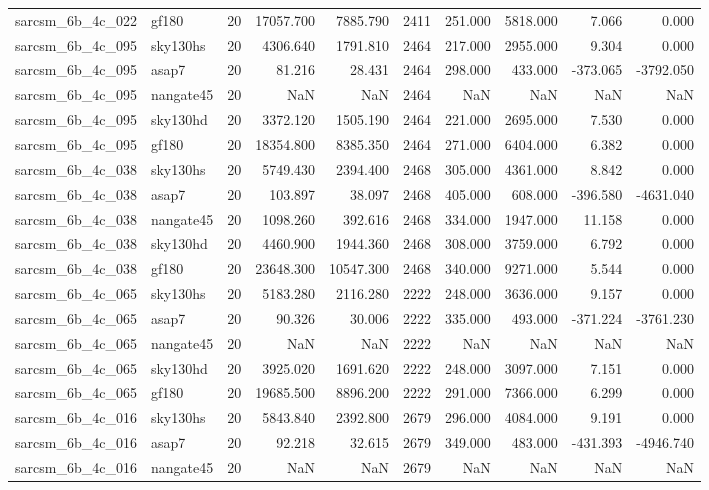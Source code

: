 \begin{longtable}{llrrrrrrrr}
sarcsm\_6b\_4c\_022 & gf180 & 20 & 17057.700 & 7885.790 & 2411 & 251.000 & 5818.000 & 7.066 & 0.000 \\
sarcsm\_6b\_4c\_095 & sky130hs & 20 & 4306.640 & 1791.810 & 2464 & 217.000 & 2955.000 & 9.304 & 0.000 \\
sarcsm\_6b\_4c\_095 & asap7 & 20 & 81.216 & 28.431 & 2464 & 298.000 & 433.000 & -373.065 & -3792.050 \\
sarcsm\_6b\_4c\_095 & nangate45 & 20 & NaN & NaN & 2464 & NaN & NaN & NaN & NaN \\
sarcsm\_6b\_4c\_095 & sky130hd & 20 & 3372.120 & 1505.190 & 2464 & 221.000 & 2695.000 & 7.530 & 0.000 \\
sarcsm\_6b\_4c\_095 & gf180 & 20 & 18354.800 & 8385.350 & 2464 & 271.000 & 6404.000 & 6.382 & 0.000 \\
sarcsm\_6b\_4c\_038 & sky130hs & 20 & 5749.430 & 2394.400 & 2468 & 305.000 & 4361.000 & 8.842 & 0.000 \\
sarcsm\_6b\_4c\_038 & asap7 & 20 & 103.897 & 38.097 & 2468 & 405.000 & 608.000 & -396.580 & -4631.040 \\
sarcsm\_6b\_4c\_038 & nangate45 & 20 & 1098.260 & 392.616 & 2468 & 334.000 & 1947.000 & 11.158 & 0.000 \\
sarcsm\_6b\_4c\_038 & sky130hd & 20 & 4460.900 & 1944.360 & 2468 & 308.000 & 3759.000 & 6.792 & 0.000 \\
sarcsm\_6b\_4c\_038 & gf180 & 20 & 23648.300 & 10547.300 & 2468 & 340.000 & 9271.000 & 5.544 & 0.000 \\
sarcsm\_6b\_4c\_065 & sky130hs & 20 & 5183.280 & 2116.280 & 2222 & 248.000 & 3636.000 & 9.157 & 0.000 \\
sarcsm\_6b\_4c\_065 & asap7 & 20 & 90.326 & 30.006 & 2222 & 335.000 & 493.000 & -371.224 & -3761.230 \\
sarcsm\_6b\_4c\_065 & nangate45 & 20 & NaN & NaN & 2222 & NaN & NaN & NaN & NaN \\
sarcsm\_6b\_4c\_065 & sky130hd & 20 & 3925.020 & 1691.620 & 2222 & 248.000 & 3097.000 & 7.151 & 0.000 \\
sarcsm\_6b\_4c\_065 & gf180 & 20 & 19685.500 & 8896.200 & 2222 & 291.000 & 7366.000 & 6.299 & 0.000 \\
sarcsm\_6b\_4c\_016 & sky130hs & 20 & 5843.840 & 2392.800 & 2679 & 296.000 & 4084.000 & 9.191 & 0.000 \\
sarcsm\_6b\_4c\_016 & asap7 & 20 & 92.218 & 32.615 & 2679 & 349.000 & 483.000 & -431.393 & -4946.740 \\
sarcsm\_6b\_4c\_016 & nangate45 & 20 & NaN & NaN & 2679 & NaN & NaN & NaN & NaN \\

\end{longtable}
